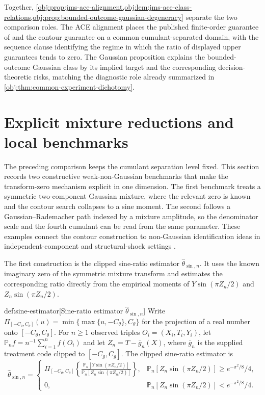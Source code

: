 \documentclass[11pt]{article}
\begin{document}
Together, \cref{obj:prop:jms-ace-alignment,obj:lem:jms-ace-class-relations,obj:prop:bounded-outcome-gaussian-degeneracy} separate the two comparison roles. The ACE alignment places the published finite-order guarantee of \citet{JinMackeySyrgkanis2025} and the contour guarantee on a common cumulant-separated domain, with the sequence clause identifying the regime in which the ratio of displayed upper guarantees tends to zero. The Gaussian proposition explains the bounded-outcome Gaussian class by its implied target and the corresponding decision-theoretic risks, matching the diagnostic role already summarized in \cref{obj:thm:common-experiment-dichotomy}.


\section{Explicit mixture reductions and local benchmarks}

The preceding comparison keeps the cumulant separation level fixed. This section records two constructive weak-non-Gaussian benchmarks that make the transform-zero mechanism explicit in one dimension. The first benchmark treats a symmetric two-component Gaussian mixture, where the relevant zero is known and the contour search collapses to a sine moment. The second follows a Gaussian--Rademacher path indexed by a mixture amplitude, so the denominator scale and the fourth cumulant can be read from the same parameter. These examples connect the contour construction to non-Gaussian identification ideas in independent-component and structural-shock settings \citep{Comon1994,HyvarinenOja1997,HyvarinenKarhunenOja2001,LanneMeitzSaikkonen2017,LeeMesters2024,HoeschLeeMesters2024,ReizingerEtAl2025}.

The first construction is the clipped sine-ratio estimator \(\widehat\theta_{\sin,n}\). It uses the known imaginary zero of the symmetric mixture transform and estimates the corresponding ratio directly from the empirical moments of \(Y\sin(\pi Z_n/2)\) and \(Z_n\sin(\pi Z_n/2)\).

\begin{definitionv}{def:sine-estimator}[Sine-ratio estimator \(\widehat\theta_{\sin,n}\)]
Write \(\Pi_{[-C_{\theta},C_{\theta}]}(u)=\min\{\max\{u,-C_{\theta}\},C_{\theta}\}\) for the projection of a real number onto \([-C_{\theta},C_{\theta}]\).  For \(n\ge 1\) observed triples \(O_i=(X_i,T_i,Y_i)\), let \(\mathbb P_n f=n^{-1}\sum_{i=1}^n f(O_i)\) and let \(Z_n=T-\bar g_n(X)\), where \(\bar g_n\) is the supplied treatment code clipped to \([-C_g,C_g]\). The clipped sine-ratio estimator is
\[
\widehat\theta_{\sin,n}
=
\begin{cases}
\displaystyle
\Pi_{[-C_{\theta},C_{\theta}]}
\left\{
\frac{\mathbb P_n[Y\sin(\pi Z_n/2)]}
{\mathbb P_n[Z_n\sin(\pi Z_n/2)]}
\right\},
&\displaystyle \mathbb P_n[Z_n\sin(\pi Z_n/2)]\ge e^{-\pi^2/8}/4,\\[3mm]
0,
&\displaystyle \mathbb P_n[Z_n\sin(\pi Z_n/2)]< e^{-\pi^2/8}/4.
\end{cases}
\]
\end{definitionv}
\end{document}
